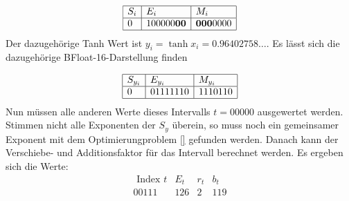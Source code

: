$$
\begin{array}{|l|l|l|}
	\hline S_i & E_{i} & M_{i} \\
	\hline 0 & 100000 \textbf{00} & \textbf{000} 0000 \\
	\hline
\end{array}
$$
Der dazugehörige Tanh Wert ist
$y_i = \tanh{x_i}=0.96402758\ldots$. Es lässt sich die dazugehörige BFloat-16-Darstellung finden

$$
\begin{array}{|l|l|l|}
	\hline S_{y_{i}} & E_{y_{i}} & M_{y_{i}} \\
	\hline 0 & 01111110 & 1110110 \\
	\hline
\end{array}
$$
Nun müssen alle anderen Werte dieses Intervalls $t = 00000$ ausgewertet werden. Stimmen nicht alle Exponenten der $S_{y}$ überein, so muss noch ein gemeinsamer Exponent mit dem Optimierungproblem \ref{} gefunden werden. Danach kann der Verschiebe- und Additionsfaktor für das Intervall berechnet werden. 
Es ergeben sich die Werte:
$$
\begin{array}{c|ccc}
	\text { Index } t & E_{t} & r_{t} & b_{t} \\
	\hline 00111 & 126 & 2 & 119
\end{array}
$$







